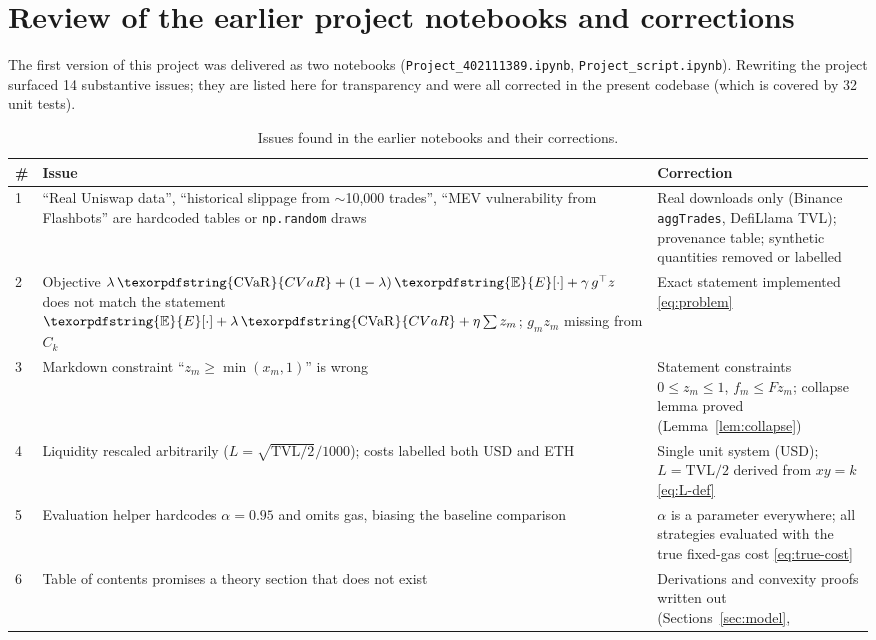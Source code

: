 \documentclass[11pt,a4paper]{article}
\theoremstyle{remark}
\newcommand{\cvar}{\texorpdfstring{\ensuremath{\mathrm{CVaR}}}{CVaR}}
\newcommand{\E}{\texorpdfstring{\ensuremath{\mathbb{E}}}{E}}
\newcommand{\code}[1]{\texttt{#1}}
\begin{document}
\section{Review of the earlier project notebooks and corrections}
\label{sec:review}

The first version of this project was delivered as two notebooks
(\code{Project\_402111389.ipynb}, \code{Project\_script.ipynb}).  Rewriting the project
surfaced 14 substantive issues; they are listed here for transparency and were all
corrected in the present codebase (which is covered by 32 unit tests).

\begin{table}[H]
\centering
\caption{Issues found in the earlier notebooks and their corrections.}
\label{tab:review}
\small
\begin{tabular}{@{}p{0.5cm}p{6.4cm}p{6.2cm}@{}}
\toprule
\# & \textbf{Issue} & \textbf{Correction} \\
\midrule
1 & ``Real Uniswap data'', ``historical slippage from $\sim$10{,}000 trades'', ``MEV
     vulnerability from Flashbots'' are hardcoded tables or \code{np.random} draws
   & Real downloads only (Binance \code{aggTrades}, DefiLlama TVL); provenance table;
     synthetic quantities removed or labelled \\
2 & Objective $\lambda\,\cvar+(1-\lambda)\,\E[\cdot]+\gamma\, g^{\top}z$ does not match the
     statement $\E[\cdot]+\lambda\,\cvar+\eta\sum z_m$; $g_m z_m$ missing from $C_k$
   & Exact statement implemented \eqref{eq:problem} \\
3 & Markdown constraint ``$z_m\ge\min(x_m,1)$'' is wrong
   & Statement constraints $0\le z_m\le1$, $f_m\le F z_m$; collapse lemma proved
     (Lemma~\ref{lem:collapse}) \\
4 & Liquidity rescaled arbitrarily ($L=\sqrt{\mathrm{TVL}/2}/1000$); costs labelled both USD
     and ETH & Single unit system (USD); $L=\mathrm{TVL}/2$ derived from $xy=k$
     \eqref{eq:L-def} \\
5 & Evaluation helper hardcodes $\alpha=0.95$ and omits gas, biasing the baseline comparison
   & $\alpha$ is a parameter everywhere; all strategies evaluated with the true fixed-gas
     cost \eqref{eq:true-cost} \\
6 & Table of contents promises a theory section that does not exist
   & Derivations and convexity proofs written out (Sections~\ref{sec:model},

\end{tabular}
\end{table}
\end{document}
